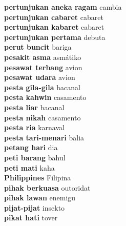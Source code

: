 \textbf{ pertunjukan aneka ragam  } cambia \\
\textbf{ pertunjukan cabaret  } cabaret \\
\textbf{ pertunjukan kabaret  } cabaret \\
\textbf{ pertunjukan pertama  } debuta \\
\textbf{ perut buncit  } bariga \\
\textbf{ pesakit asma  } asmátiko \\
\textbf{ pesawat terbang  } avion \\
\textbf{ pesawat udara  } avion \\
\textbf{ pesta gila-gila  } bacanal \\
\textbf{ pesta kahwin  } casamento \\
\textbf{ pesta liar  } bacanal \\
\textbf{ pesta nikah  } casamento \\
\textbf{ pesta ria  } karnaval \\
\textbf{ pesta tari-menari  } balia \\
\textbf{ petang hari  } dia \\
\textbf{ peti barang  } bahul \\
\textbf{ peti mati  } kaha \\
\textbf{ Philippines  } Filipina \\
\textbf{ pihak berkuasa  } outoridat \\
\textbf{ pihak lawan  } enemigu \\
\textbf{ pijat-pijat  } insekto \\
\textbf{ pikat hati  } tover \\
